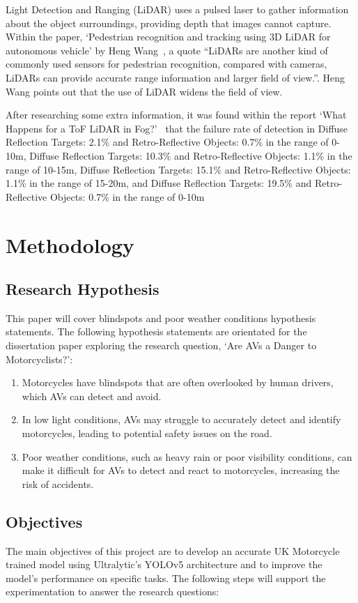\documentclass[conference]{IEEEtran}
\begin{document}
		Light Detection and Ranging (LiDAR) uses a pulsed laser to gather information about the object surroundings, providing depth that images cannot capture. Within the paper, `Pedestrian recognition and tracking using 3D LiDAR for autonomous vehicle' by Heng Wang~\cite{wang_pedestrian_2017}, a quote ``LiDARs are another kind of commonly used sensors for pedestrian recognition, compared with cameras, LiDARs can provide accurate range information and larger field of view.''. Heng Wang points out that the use of LiDAR widens the field of view.
		
		After researching some extra information, it was found within the report `What Happens for a ToF LiDAR in Fog?'~\cite{li_what_2021} that the failure rate of detection in Diffuse Reflection Targets: 2.1\% and Retro-Reflective Objects: 0.7\% in the range of 0-10m, Diffuse Reflection Targets: 10.3\% and Retro-Reflective Objects: 1.1\% in the range of 10-15m, Diffuse Reflection Targets: 15.1\% and Retro-Reflective Objects: 1.1\% in the range of 15-20m, and Diffuse Reflection Targets: 19.5\% and Retro-Reflective Objects: 0.7\% in the range of 0-10m~\cite{royo_overview_2019}

\section{Methodology}
	\subsection{Research Hypothesis}
		This paper will cover blindspots and poor weather conditions hypothesis statements. The following hypothesis statements are orientated for the dissertation paper exploring the research question, `Are AVs a Danger to Motorcyclists?':

		\begin{enumerate}
		\item Motorcycles have blindspots that are often overlooked by human drivers, which AVs can detect and avoid.
		\item In low light conditions, AVs may struggle to accurately detect and identify motorcycles, leading to potential safety issues on the road.
		\item Poor weather conditions, such as heavy rain or poor visibility conditions, can make it difficult for AVs to detect and react to motorcycles, increasing the risk of accidents.
		\end{enumerate}

	\subsection{Objectives}
		The main objectives of this project are to develop an accurate UK Motorcycle trained model using Ultralytic's YOLOv5 architecture and to improve the model's performance on specific tasks. The following steps will support the experimentation to answer the research questions:
\end{document}
